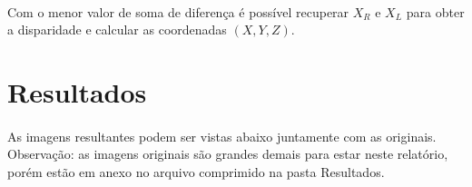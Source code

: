 \documentclass[conference, harvard, brazil, english]{sbatex}
\begin{document}
		\paragraph{}
			Com o menor valor de soma de diferença é possível recuperar $ X_{R} $ e $ X _{L}$ para obter a disparidade e calcular as coordenadas $ (X,Y,Z) $. 
	
	\section{Resultados}
		\paragraph{}
			As imagens resultantes podem ser vistas abaixo juntamente com as originais.\\Observação: as imagens originais são grandes demais para estar neste relatório, porém estão em anexo no arquivo comprimido na pasta Resultados.
\end{document}

